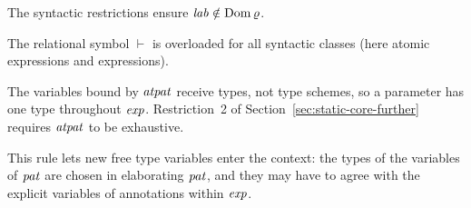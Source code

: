 

\begin{rulecomments}
 The syntactic restrictions ensure $\mathit{lab} \notin
\mathrm{Dom}\,\varrho$.
\end{rulecomments}






\begin{rulecomments}
 The relational symbol $\vdash$ is overloaded for all
syntactic classes (here atomic expressions and expressions).

 The variables bound by $\mathit{atpat}$ receive types, not
type schemes, so a parameter has one type throughout $\mathit{exp}$. Restriction~2 of
Section~\ref{sec:static-core-further} requires $\mathit{atpat}$ to be exhaustive.
\end{rulecomments}





\begin{rulecomments}
 This rule lets new free type variables enter the context:
the types of the variables of $\mathit{pat}$ are chosen in elaborating $\mathit{pat}$, and they
may have to agree with the explicit variables of annotations within $\mathit{exp}$.
\end{rulecomments}

